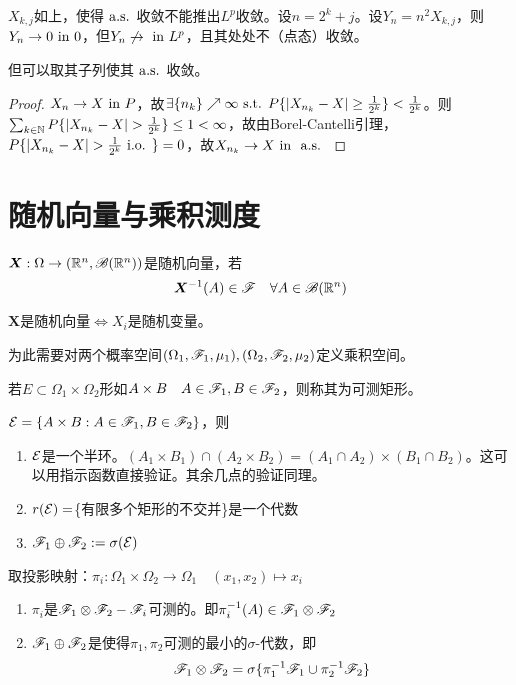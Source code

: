 \documentclass{ctexart}
\begin{document}
\begin{Eg}
  $X_{k,j}$如上，使得$\text{ a.s. }$收敛不能推出$L^{p}$收敛。设$n=2^{k}+j$。设$Y_{n}=n^{2}X_{k,j}$，则$Y_{n}\to 0\text{ in } 0$，但$Y_{n}\not\to\text{ in } L^{p}$，且其处处不（点态）收敛。

  但可以取其子列使其$\text{ a.s. }$收敛。
\end{Eg}

\begin{proof}
  $X_{n}\to X\text{ in } P$，故$\exists \{n_{k}\}\nearrow\infty\text{ s.t. } P\{|X_{n_{k}}-X|\geq\frac{1}{2^{k}}\}<\frac{1}{2^{k}}$。则$\sum_{k\in\N}P\{|X_{n_{k}}-X|>\frac{1}{2^{k}}\}\leq 1<\infty$，故由Borel-Cantelli引理，$P\{|X_{n_{k}}-X|>\frac{1}{2^{k}}\inof\}=0$，故$X_{n_{k}}\to X\text{ in }\text{ a.s. }$
\end{proof}

\section{随机向量与乘积测度}
\begin{Def}
  $\bm X:\Omega\to (\mathbb{R}^{n},\mathscr{B}(\mathbb{R}^{n}))$是随机向量，若
  \[\bm{X}^{-1}(A)\in\mathscr{F}\quad\forall A\in\mathscr{B}(\mathbb{R}^{n})\]
\end{Def}

\begin{Prop}
  $\bm{X}$是随机向量$\Leftrightarrow X_{i}$是随机变量。
\end{Prop}

为此需要对两个概率空间$(\Omega_{1},\mathscr{F}_{1},\mu_{1}),(\Omega_{2},\mathscr{F}_{2},\mu_{2})$定义乘积空间。

\begin{Def}[可测矩形]
  若$E\subset \Omega_{1}\times\Omega_{2}$形如$A\times B\quad A\in\mathscr{F}_{1},B\in \mathscr{F}_{2}$，则称其为可测矩形。
\end{Def}
$\mathcal{E}=\{A\times B:A\in\mathscr{F}_{1},B\in \mathscr{F}_{2}\}$，则
\begin{enumerate}
\item $\mathcal{E}$是一个半环。$(A_{1}\times B_{1})\cap (A_{2}\times B_{2})=(A_{1}\cap A_{2})\times (B_{1}\cap B_{2})$。这可以用指示函数直接验证。其余几点的验证同理。
\item $r(\mathcal{E})=$\{有限多个矩形的不交并\}是一个代数
\item $\mathscr{F}_{1}\oplus \mathscr{F}_{2}:=\sigma(\mathcal{E})$ 
\end{enumerate}

取投影映射：$\pi_{i}:\Omega_{1}\times \Omega_{2}\to\Omega_{1}\quad (x_{1},x_{2})\mapsto x_{i}$
\begin{Prop}
  \begin{enumerate}
  \item $\pi_{i}$是$\mathscr{F}_{1}\otimes\mathscr{F}_{2}-\mathscr{F}_{i}$可测的。即$\pi_{i}^{-1}(A)\in \mathscr{F}_{1}\otimes \mathscr{F}_{2}$
  \item $\mathscr{F}_{1}\oplus\mathscr{F}_{2}$是使得$\pi_{1},\pi_{2}$可测的最小的$\sigma$-代数，即
    \[\mathscr{F}_{1}\otimes\mathscr{F}_{2}=\sigma\{\pi_{1}^{-1}\mathscr{F}_{1}\cup \pi_{2}^{-1}\mathscr{F}_{2}\}\]
  \end{enumerate}
\end{Prop}
\end{document}
